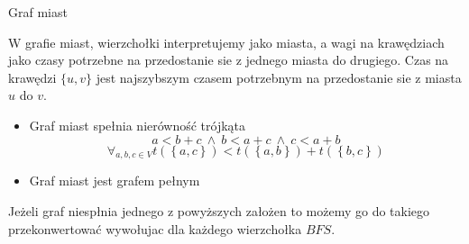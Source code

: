 \begin{frame}{Graf miast}
		
	W grafie miast, wierzchołki interpretujemy jako miasta, a wagi na krawędziach jako czasy potrzebne na przedostanie sie z jednego miasta do drugiego.
	Czas na krawędzi $\{u, v\}$ jest najszybszym czasem potrzebnym na przedostanie sie z miasta $u$ do $v$.
	\begin{itemize}
		\item Graf miast spełnia nierówność trójkąta
			\begin{equation}
				a < b + c \ \wedge \ b < a + c \ \wedge \ c < a + b
			\end{equation}
			\begin{equation}
				\forall_{a,b,c \in V} t(\left\{a, c\right\}) < t(\left\{a, b\right\}) + t(\left\{b, c\right\})
			\end{equation}
		\item Graf miast jest grafem pełnym
	\end{itemize}
	Jeżeli graf niespłnia jednego z powyższych założen to możemy go do takiego przekonwertować wywołujac dla każdego wierzchołka $BFS$.

\end{frame}
